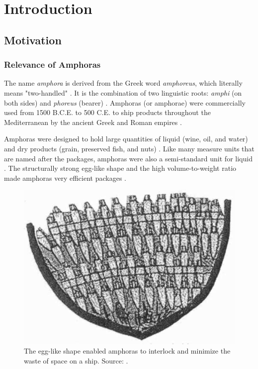 \documentclass[a4paper, 11pt, oneside]{article}
\begin{document}
  \newpage

  \tableofcontents

  \clearpage

  \section{Introduction}

  \subsection{Motivation}

  \subsubsection{Relevance of Amphoras}

  The name \textit{amphora} is derived from the Greek word \textit{amphoreus}, which literally means "two-handled"
  \cite{harper2001online, twede2002commercial, will1977ancient}. It is the combination of two linguistic roots:
  \textit{amphi} (on both sides) and \textit{phoreus} (bearer)
  \cite{harper2001online, twede2002commercial, will1977ancient}. Amphoras (or amphorae) were commercially used from
  1500 B.C.E. to 500 C.E. to ship products throughout the Mediterranean by the ancient Greek and Roman empires
  \cite{twede2002commercial, worldhistory}.

  Amphoras were designed to hold large quantities of liquid (wine, oil, and water) and dry products
  (grain, preserved fish, and nuts) \cite{twede2002commercial, foley2012aspects, grace1979amphoras}. Like many measure
  units that are named after the packages, amphoras were also a semi-standard unit for liquid \cite{twede2002commercial}.
  The structurally strong egg-like shape and the high volume-to-weight ratio made amphoras very efficient packages
  \cite{twede2002commercial, worldhistory}.

  \begin{figure}[ht]
    \begin{center}
      \includegraphics[width=.6\textwidth]{amphora_stowage_aboard_ship.png}
    \end{center}
    \caption{The egg-like shape enabled amphoras to interlock and minimize the waste of space on a ship.
    Source: \cite{twede2002commercial}.}
  \end{figure}
\end{document}
